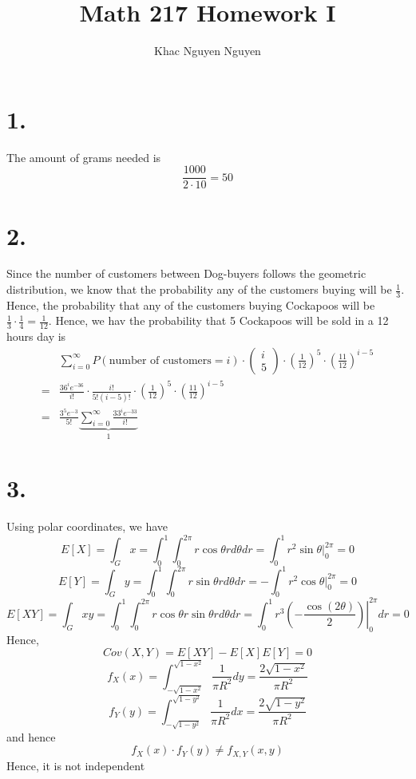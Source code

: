 \documentclass[11pt]{article}
\title{\textbf{Math 217 Homework I}}
\author{Khac Nguyen Nguyen}
\date{}
\begin{document}
\section*{1.}
The amount of grams needed is 
\[
    \frac{1000}{2 \cdot 10} = 50    
\]
\pagebreak
\section*{2.}
Since the number of customers between Dog-buyers follows the geometric distribution, we know that
the probability any of the customers buying will be $\frac{1}{3}$. Hence, the probability that any 
of the customers buying Cockapoos will be $\frac{1}{3} \cdot \frac{1}{4} = \frac{1}{12}$. Hence, 
we hav the probability that 5 Cockapoos will be sold in a 12 hours day is 
\begin{equation*}
    \begin{aligned}
        &\sum_{i=0}^\infty P(\text{number of customers}=i) \cdot 
        \begin{pmatrix}
            i \\
            5
        \end{pmatrix}
        \cdot \left(\frac{1}{12}\right)^5
        \cdot \left(\frac{11}{12}\right)^{i-5} \\
        =&
        \frac{36^i e^{-36}}{i!} \cdot \frac{i!}{5!(i-5)!} 
        \cdot \left(\frac{1}{12}\right)^5
        \cdot \left(\frac{11}{12}\right)^{i-5} \\
        =& 
        \frac{3^5 e^{-3}}{5!} \underbrace{\sum_{i=0}^\infty \frac{33^i e^{-33}}{i!}}_{1}
    \end{aligned}
\end{equation*}
\pagebreak
\section*{3.}
Using polar coordinates, we have 
\[
    E[X] = \int_G x = \int_0^1 \int_0^{2\pi} r\cos{\theta} r d\theta dr = \int_0^1 r^2 \sin\theta|_0^{2\pi} = 0 
\]
\[
    E[Y] = \int_G y = \int_0^1 \int_0^{2\pi} r\sin{\theta} r d\theta dr = - \int_0^1 r^2 \cos\theta|_0^{2\pi} = 0 
\]
\[
    E[XY] = \int_G xy = \int_0^1 \int_0^{2\pi} r\cos{\theta} r\sin\theta  r d\theta dr = \int_0^1 r^3 \left.\left(-\frac{\cos(2\theta)}{2}\right)\right|_0^{2\pi} dr = 0  
\]
Hence, 
\[
    Cov(X,Y) = E[XY] - E[X]E[Y] = 0    
\]
\[
    f_X(x) =  \int_{-\sqrt{1-x^2}}^{\sqrt{1-x^2}} \frac{1}{\pi R^2} dy = \frac{2 \sqrt{1-x^2}}{\pi R^2}
\]
\[
    f_Y(y) =  \int_{-\sqrt{1-y^2}}^{\sqrt{1-y^2}} \frac{1}{\pi R^2} dx = \frac{2 \sqrt{1-y^2}}{\pi R^2}
\]
and hence 
\[
    f_X(x) \cdot f_Y(y) \ne f_{X,Y}(x,y)    
\]
Hence, it is not independent 
\pagebreak
\end{document}
